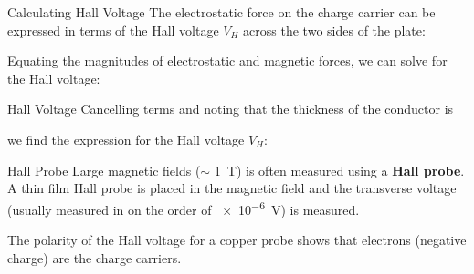 \documentclass[12pt,aspectratio=169]{beamer}
\begin{document}
\begin{frame}{Calculating Hall Voltage}
  The electrostatic force on the charge carrier can be expressed in terms of
  the Hall voltage $V_H$ across the two sides of the plate:

  
  Equating the magnitudes of electrostatic and magnetic forces, we can solve
  for the Hall voltage:

\end{frame}


\begin{frame}{Hall Voltage}
  Cancelling terms and noting that the thickness of the conductor is


  we find the expression for the Hall voltage $V_H$:

\end{frame}



\begin{frame}{Hall Probe}
  Large magnetic fields ($\sim$ \SI{1}{\tesla}) is often measured using a
  \textbf{Hall probe}. A thin film Hall probe is placed in the magnetic field
  and the transverse voltage (usually measured in on the order of
  \SI{e-6}{\volt}) is measured.

  \begin{center}
  \end{center}
  The polarity of the Hall voltage for a copper probe shows that electrons
  (negative charge) are the charge carriers.
\end{frame}
\end{document}
